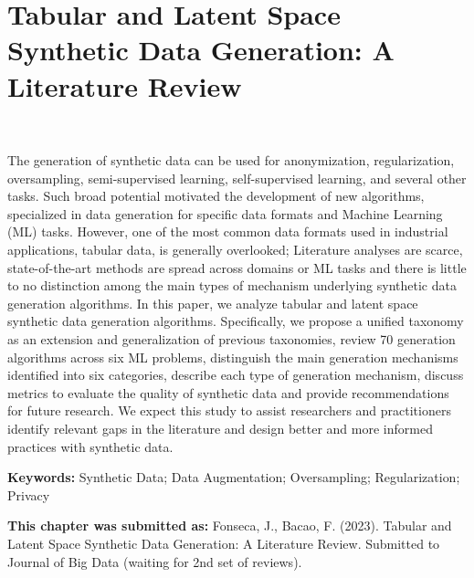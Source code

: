 \chapter{%
    Tabular and Latent Space Synthetic Data Generation: A Literature Review
}~\label{chp:synthetic-data-review}
\graphicspath{{figures/synthetic-data-review/}}

\begin{adjustwidth}{30pt}{30pt}

    The generation of synthetic data can be used for anonymization,
    regularization, oversampling, semi-supervised learning, self-supervised
    learning, and several other tasks. Such broad potential motivated the
    development of new algorithms, specialized in data generation for specific
    data formats and Machine Learning (ML) tasks. However, one of the most
    common data formats used in industrial applications, tabular data, is
    generally overlooked; Literature analyses are scarce, state-of-the-art
    methods are spread across domains or ML tasks and there is little to no
    distinction among the main types of mechanism underlying synthetic data
    generation algorithms. In this paper, we analyze tabular and latent space
    synthetic data generation algorithms. Specifically, we propose a unified
    taxonomy as an extension and generalization of previous taxonomies, review
    70 generation algorithms across six ML problems, distinguish the main
    generation mechanisms identified into six categories, describe each type
    of generation mechanism, discuss metrics to evaluate the quality of
    synthetic data and provide recommendations for future research. We expect
    this study to assist researchers and practitioners identify relevant gaps
    in the literature and design better and more informed practices with
    synthetic data.

\end{adjustwidth}

\vspace{.5cm}
\textbf{Keywords:} Synthetic Data; Data Augmentation; Oversampling;
Regularization; Privacy











\textbf{This chapter was submitted as:}
Fonseca, J., Bacao, F. (2023). Tabular and Latent Space Synthetic Data Generation: A Literature
Review. Submitted to Journal of Big Data (waiting for 2nd set of reviews).
